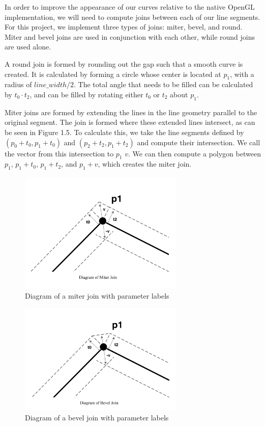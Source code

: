 \documentclass[11pt]{report}
\begin{document}
In order to improve the appearance of our curves relative to the native OpenGL implementation, we will need to compute joins between each of our line segments.
For this project, we implement three types of joins: miter, bevel, and round.
Miter and bevel joins are used in conjunction with each other, while round joins are used alone.

A round join is formed by rounding out the gap such that a smooth curve is created. 
It is calculated by forming a circle whose center is located at $p_1$, with a radius of $line\_width/2$. 
The total angle that needs to be filled can be calculated by $t_0 \cdot t_2$, and can be filled by rotating either $t_0$ or $t_2$ about $p_1$.

Miter joins are formed by extending the lines in the line geometry parallel to the original segment.
The join is formed where these extended lines intersect, as can be seen in Figure 1.5.
To calculate this, we take the line segments defined by $(p_0 + t_0, p_1 + t_0)$ and $(p_2 + t_2, p_1 + t_2)$ and compute their intersection. We call the vector from this intersection to $p_1$ $v$.
We can then compute a polygon between $p_1$, $p_1 + t_0$, $p_1 + t_2$, and $p_1 + v$, which creates the miter join. 

\begin{figure}
	\begin{center}
		\includegraphics[width=0.7\textwidth]{miter.png}
		\caption{Diagram of a miter join with parameter labels}
	\end{center}
\end{figure}

\begin{figure}
	\begin{center}
		\includegraphics[width=0.7\textwidth]{bevel.png}
		\caption{Diagram of a bevel join with parameter labels}
	\end{center}
\end{figure}
\end{document}
